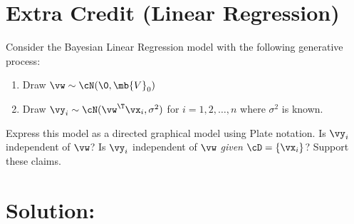 \documentclass[189]{pset}
\begin{document}
  \clearpage


  \section{Extra Credit (Linear Regression)}
    Consider the Bayesian Linear Regression model with the following
    generative process:
    \begin{enumerate}[label=\arabic*.]
      \item Draw $\vw \sim \cN(\0, \mb{V}_0)$
      \item Draw $\vy_i \sim \cN(\vw^\T\vx_i, \sigma^2)$ for
        $i=1,2,\dots,n$ where $\sigma^2$ is known.
    \end{enumerate}
    Express this model as a directed graphical model using Plate
    notation. Is $\vy_i$ independent of $\vw$? Is $\vy_i$ independent
    of $\vw$ \textit{given} $\cD = \{\vx_i\}$? Support these claims.

  \hrulefill

  \section*{Solution:}
\end{document}
